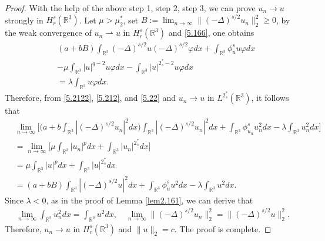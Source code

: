 \documentclass[11pt]{article}
\numberwithin{equation}{section}
\begin{document}
\begin{proof}
With the help  of  the above step 1, step 2, step 3, we can prove $u_n\to u$ 
strongly in $H^s_r(\mathbb{R}^3)$. Let $\mu>\mu^*_2$, set 
$B:=\lim_{n\to\infty} \|(-\Delta)^{s/2}u_n\|^2_2\geq 0 $, by the weak convergence of 
$u_n\rightharpoonup u$ in  $H^s_r(\mathbb{R}^3)$ and  \eqref{5.166}, one obtains
\begin{equation}\label{5.22}
\begin{split}
&(a+bB)\int_{\mathbb{R}^3}(-\Delta)^{s/2}u(-\Delta)^{s/2}\varphi dx
 +\int_{\mathbb{R}^3}\phi^s_{u}u\varphi dx\\
&-\mu \int_{\mathbb{R}^3}|u|^{q-2}u\varphi dx
 -\int_{\mathbb{R}^3}|u|^{2^*_s-2}u\varphi dx \\
&=\lambda \int_{\mathbb{R}^3} u\varphi dx.
\end{split}
\end{equation}
Therefore, from \eqref{5.2122}, \eqref{5.212}, and \eqref{5.22} and 
$u_n\to u$ in $L^{2^*_s}(\mathbb{R}^3)$, it follows that
\begin{align*} %
&\lim_{n\to\infty}\Big[\Big(a+b\int_{\mathbb{R}^3}|(-\Delta)^{s/2}u_n|^2dx\Big)
 \int_{\mathbb{R}^3}|(-\Delta)^{s/2}u_n|^2 dx
 +\int_{\mathbb{R}^3}\phi^s_{u_n}{u^2_n}dx
 -\lambda \int_{\mathbb{R}^3} {u^2_n} dx\Big]\\
&=\lim_{n\to\infty}\Big [\mu \int_{\mathbb{R}^3}|u_n|^{p}dx
 +\int_{\mathbb{R}^3}|u_n|^{2^*_s} dx\Big]\\
&=\mu \int_{\mathbb{R}^3}|u|^{p}dx+\int_{\mathbb{R}^3}|u|^{2^*_s} dx\\
&=(a+bB)\int_{\mathbb{R}^3}|(-\Delta)^{s/2}u|^2 dx
 +\int_{\mathbb{R}^3}\phi^s_{u}{u^2}dx
 -\lambda \int_{\mathbb{R}^3} {u^2} dx.
\end{align*}
Since $\lambda<0$, as in the proof of Lemma {\ref{lem2.161}},  
we can derive that
\begin{align*} %
\lim_{n\to\infty} \int_{\mathbb{R}^3} {u^2_n} dx
= \int_{\mathbb{R}^3} {u^2} dx,\quad
\lim_{n\to\infty}  \|(-\Delta)^{s/2}u_n\|^2_2 = \|(-\Delta)^{s/2}u\|^2_2.
\end{align*}
Therefore, $u_n\to u$ in $H^s_{r}(\mathbb{R}^3)$ and $\|u\|_2=c$. 
The proof is complete.
\end{proof}
\end{document}
